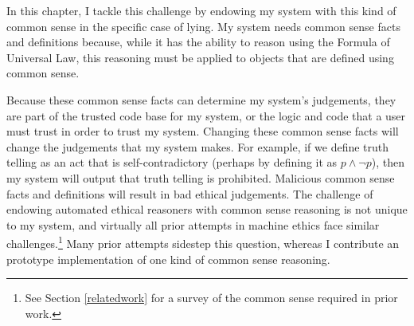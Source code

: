 \begin{isabellebody}
\begin{isamarkuptext}
In this chapter, I tackle this challenge by
endowing my system with this kind of common sense in the specific case of lying. My system needs common 
sense facts and definitions because, while it has the ability to reason
using the Formula of Universal Law, this reasoning must be applied to objects that are defined
using common sense. 

Because these common sense facts can determine my system's judgements, they are part of the trusted
code base for my system, or the logic and code that a user must trust in order to trust my system. 
Changing these common sense facts will change the judgements 
that my system makes. For example, if we define truth telling as an act that is self-contradictory (perhaps
by defining it as $p \wedge \neg p$), then my system will output that truth telling is prohibited.
Malicious common sense facts and definitions will result in bad ethical judgements. 
The challenge of endowing automated ethical reasoners with common sense reasoning is not unique to my 
system, and virtually all prior attempts in machine ethics face similar challenges.\footnote{See Section
\ref{relatedwork} for a survey of the common sense required in prior work.} Many prior attempts
sidestep this question, whereas I contribute an prototype implementation of one kind of common sense reasoning.


\end{isamarkuptext}
\end{isabellebody}
